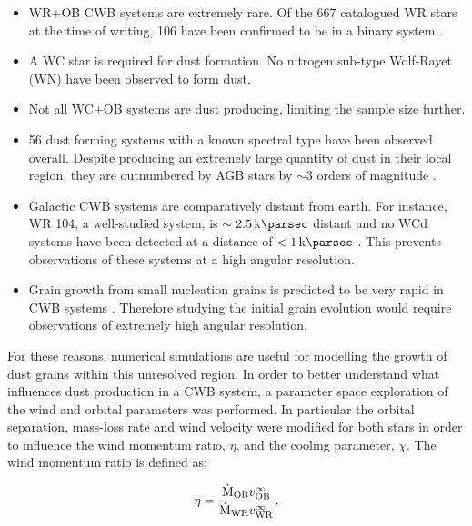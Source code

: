 \documentclass[fleqn,usenatbib]{mnras}
\begin{document}
\begin{itemize}
  \item WR+OB CWB systems are extremely rare. Of the 667 catalogued WR stars at the time of writing, 106 have been confirmed to be in a binary system \citep{rossloweSpatialDistributionGalactic2015,williamsVariableDustEmission2019}.
  \item A WC star is required for dust formation. No nitrogen sub-type Wolf-Rayet (WN) have been observed to form dust.
  \item Not all WC+OB systems are dust producing, limiting the sample size further.
  \item 56 dust forming systems with a known spectral type have been observed overall. Despite producing an extremely large quantity of dust in their local region, they are outnumbered by AGB stars by $\sim 3$ orders of magnitude \citep{ishiharaGalacticDistributionsCarbon2011}.
  \item Galactic CWB systems are comparatively distant from earth. For instance, WR 104, a well-studied system, is $\sim \SI{2.5}{\kilo\parsec}$ distant \citep{soulainSPHEREViewWolfRayet2018} and no WCd systems have been detected at a distance of $< 1 \, \si{\kilo\parsec}$ \citep{rossloweSpatialDistributionGalactic2015}. This prevents observations of these systems at a high angular resolution.
  \item Grain growth from small nucleation grains is predicted to be very rapid in CWB systems \citep{zubkoPhysicalModelDust1998a}. Therefore studying the initial grain evolution would require observations of extremely high angular resolution.
\end{itemize}

For these reasons, numerical simulations are useful for modelling the growth of dust grains within this unresolved region.
In order to better understand what influences dust production in a CWB system, a parameter space exploration of the wind and orbital parameters was performed.
In particular the orbital separation, mass-loss rate and wind velocity were modified for both stars in order to influence the wind momentum ratio, $\eta$, and the cooling parameter, $\chi$.
The wind momentum ratio is defined as:

\begin{equation}
  \label{eq:paper1-eta}
  \eta = \frac{\dot{\text M}_\text{OB} v^\infty_\text{OB}}{\dot{\text M}_\text{WR}v^\infty_\text{WR}} ,
\end{equation}
\end{document}
